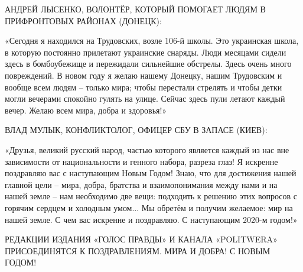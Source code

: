 АНДРЕЙ ЛЫСЕНКО, ВОЛОНТЁР, КОТОРЫЙ ПОМОГАЕТ ЛЮДЯМ В ПРИФРОНТОВЫХ РАЙОНАХ
(ДОНЕЦК):

«Сегодня я находился на Трудовских, возле 106-й школы. Это украинская школа, в
которую постоянно прилетают украинские снаряды. Люди месяцами сидели здесь в
бомбоубежище и пережидали сильнейшие обстрелы. Здесь очень много повреждений. В
новом году я желаю нашему Донецку, нашим Трудовским и вообще всем людям –
только мира; чтобы перестали стрелять и чтобы детки могли вечерами спокойно
гулять на улице. Сейчас здесь пули летают каждый вечер. Желаю всем мира, добра
и здоровья!»

ВЛАД МУЛЫК, КОНФЛИКТОЛОГ, ОФИЦЕР СБУ В ЗАПАСЕ (КИЕВ):

«Друзья, великий русский народ, частью которого является каждый из нас вне
зависимости от национальности и генного набора, разреза глаз! Я искренне
поздравляю вас с наступающим Новым Годом! Знаю, что для достижения нашей
главной цели – мира, добра, братства и взаимопонимания между нами и на нашей
земле – нам необходимо две вещи: подходить к решению этих вопросов с горячим
сердцем и холодным умом... Мы обретём и получим желаемое: мир на нашей земле. С
чем вас искренне и поздравляю. С наступающим 2020-м годом!»

РЕДАКЦИИ ИЗДАНИЯ «ГОЛОС ПРАВДЫ» И КАНАЛА «POLITWERA» ПРИСОЕДИНЯТСЯ К
ПОЗДРАВЛЕНИЯМ. МИРА И ДОБРА! С НОВЫМ ГОДОМ!
